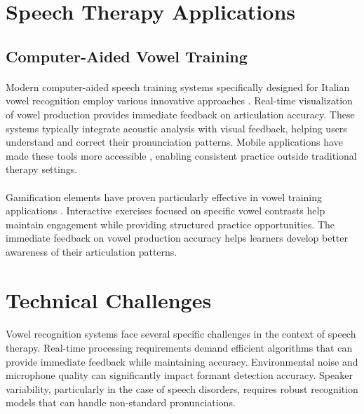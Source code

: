 \section{Speech Therapy Applications}
\label{sec:applications}

\subsection{Computer-Aided Vowel Training}
\label{subsec:computer-aided}

\paragraph{}
Modern computer-aided speech training systems specifically designed for Italian vowel recognition employ various innovative approaches \cite{italian_therapy2023}. Real-time visualization of vowel production provides immediate feedback on articulation accuracy. These systems typically integrate acoustic analysis with visual feedback, helping users understand and correct their pronunciation patterns. Mobile applications have made these tools more accessible \cite{mobile_speech2022}, enabling consistent practice outside traditional therapy settings.

\paragraph{}
Gamification elements have proven particularly effective in vowel training applications \cite{gamification2023}. Interactive exercises focused on specific vowel contrasts help maintain engagement while providing structured practice opportunities. The immediate feedback on vowel production accuracy helps learners develop better awareness of their articulation patterns.

\section{Technical Challenges}
\label{sec:challenges}

\paragraph{}
Vowel recognition systems face several specific challenges in the context of speech therapy. Real-time processing requirements demand efficient algorithms that can provide immediate feedback while maintaining accuracy. Environmental noise and microphone quality can significantly impact formant detection accuracy. Speaker variability, particularly in the case of speech disorders, requires robust recognition models that can handle non-standard pronunciations.

